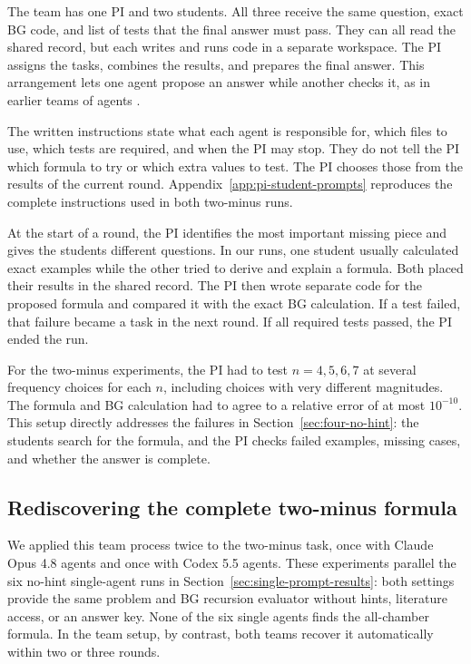 \documentclass{article}
\begin{document}
The team has one PI and two students. All three receive the same
question, exact BG code, and list of tests that the final answer must pass.
They can all read the shared record, but each writes and runs code in a separate
workspace. The PI assigns the tasks, combines the results, and prepares the
final answer. This arrangement lets one agent propose an answer while another
checks it, as in earlier teams of agents
\citep{Li2023CAMEL,Wu2023AutoGen,Qian2023ChatDev,Hong2023MetaGPT,
Du2023MultiagentDebate,Guo2024MultiAgentSurvey,Schmidgall2025AgentLaboratory,
Gottweis2025CoScientist,VillaescusaNavarro2025Denario,Ghareeb2026Robin}.

The written instructions state what each agent is responsible for, which files
to use, which tests are required, and when the PI may stop. They do not tell
the PI which formula to try or which extra values to test. The PI chooses
those from the results of the current round. Appendix~\ref{app:pi-student-prompts}
reproduces the complete instructions used in both two-minus runs.

At the start of a round, the PI identifies the most important missing piece
and gives the students different questions. In our runs, one student
usually calculated exact examples while the other tried to derive and explain
a formula. Both placed their results in the shared record. The PI then wrote
separate code for the proposed formula and compared it with the exact BG
calculation. If a test failed, that failure became a task in the next round. If
all required tests passed, the PI ended the run.

For the two-minus experiments, the PI had to test $n=4,5,6,7$ at several
frequency choices for each $n$, including choices with very different
magnitudes. The formula and BG calculation had to agree to a relative error of
at most $10^{-10}$. This setup directly addresses the failures in
Section~\ref{sec:four-no-hint}: the students search for the formula, and
the PI checks failed examples, missing cases, and whether the answer is
complete.

\subsection{Rediscovering the complete two-minus formula}
\label{sec:multiagent-two-minus}

We applied this team process twice to the two-minus task, once with Claude Opus
4.8 agents and once with Codex 5.5 agents. These experiments parallel the six
no-hint single-agent runs in Section~\ref{sec:single-prompt-results}: both
settings provide the same problem and BG recursion evaluator without hints,
literature access, or an answer key. None of the six single agents finds the all-chamber formula. In the
team setup, by contrast, both teams recover it automatically within two or
three rounds.
\end{document}
